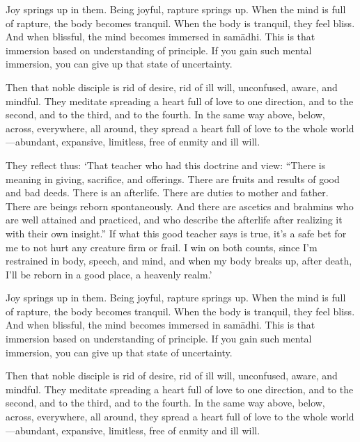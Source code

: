 \documentclass[12pt,openany]{book}%
\begin{document}
Joy springs up in them. Being joyful, rapture springs up. When the mind is full of rapture, the body becomes tranquil. When the body is tranquil, they feel bliss. And when blissful, the mind becomes immersed in \textsanskrit{samādhi}. This is that immersion based on understanding of principle. If you gain such mental immersion, you can give up that state of uncertainty. 

Then that noble disciple is rid of desire, rid of ill will, unconfused, aware, and mindful. They meditate spreading a heart full of love to one direction, and to the second, and to the third, and to the fourth. In the same way above, below, across, everywhere, all around, they spread a heart full of love to the whole world—abundant, expansive, limitless, free of enmity and ill will. 

They reflect thus: ‘That teacher who had this doctrine and view: “There is meaning in giving, sacrifice, and offerings. There are fruits and results of good and bad deeds. There is an afterlife. There are duties to mother and father. There are beings reborn spontaneously. And there are ascetics and brahmins who are well attained and practiced, and who describe the afterlife after realizing it with their own insight.” If what this good teacher says is true, it’s a safe bet for me to not hurt any creature firm or frail. I win on both counts, since I’m restrained in body, speech, and mind, and when my body breaks up, after death, I’ll be reborn in a good place, a heavenly realm.’ 

Joy springs up in them. Being joyful, rapture springs up. When the mind is full of rapture, the body becomes tranquil. When the body is tranquil, they feel bliss. And when blissful, the mind becomes immersed in \textsanskrit{samādhi}. This is that immersion based on understanding of principle. If you gain such mental immersion, you can give up that state of uncertainty. 

Then that noble disciple is rid of desire, rid of ill will, unconfused, aware, and mindful. They meditate spreading a heart full of love to one direction, and to the second, and to the third, and to the fourth. In the same way above, below, across, everywhere, all around, they spread a heart full of love to the whole world—abundant, expansive, limitless, free of enmity and ill will. 
\end{document}

